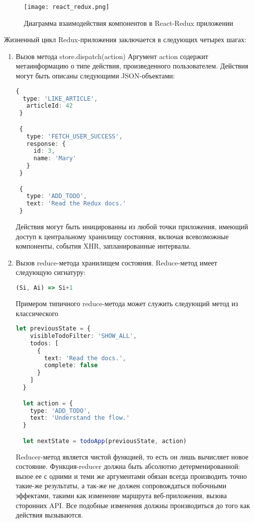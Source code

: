 \begin{figure}[ht]
\centering
  \texttt{[image: react\_redux.png]}
  \caption{Диаграмма взаимодействия компонентов в React-Redux приложении}
  \label{figure:domain:react_redux}
\end{figure}

Жизненный цикл Redux-приложения заключается в следующих четырех шагах:

\begin{enumerate}[label=\arabic*.]
\item
 Вызов метода store.dispatch(action)
 Аргумент action содержит метаинформацию о типе действия, произведенного пользователем. Действия могут быть описаны следующими JSON-объектами:
 \begin{lstlisting}[language=TypeScript, label=lst:domain:redux0]
 {
  type: 'LIKE_ARTICLE',
   articleId: 42
 }

 {
   type: 'FETCH_USER_SUCCESS',
   response: {
     id: 3,
     name: 'Mary'
   }
 }

 {
   type: 'ADD_TODO',
   text: 'Read the Redux docs.'
 }
 \end{lstlisting}
 Действия могут быть иницированны из любой точки приложения, имеющий доступ к центральному хранилищу состояния, включая всевозможные компоненты, события XHR, запланированные интервалы.

\item
  Вызов reduce-метода хранилищем состояния. Reduce-метод имеет следующую сигнатуру:
  \begin{lstlisting}[language=TypeScript, label=lst:domain:redux1]
    (Si, Ai) => Si+1
  \end{lstlisting}

  Примером типичного reduce-метода может служить следующий метод из классического 

  \begin{lstlisting}[language=TypeScript, label=lst:domain:redux2]
  let previousState = {
    visibleTodoFilter: 'SHOW_ALL',
    todos: [
      {
        text: 'Read the docs.',
        complete: false
      }
    ]
  }

  let action = {
    type: 'ADD_TODO',
    text: 'Understand the flow.'
  }

  let nextState = todoApp(previousState, action)

  \end{lstlisting}

  Reducer-метод является чистой функцией, то есть он лишь вычисляет новое состояние. Функция-reducer должна быть абсолютно детерменированной:
  вызое ее с одними и теми же аргументами обязан всегда производить точно такие-же результаты, а так-же не должен сопровождаться побочными эффектами,
  такими как изменение маршрута веб-приложения, вызова сторонних API. Все подобные изменения должны производиться до того как действия вызываются.


\end{enumerate}
